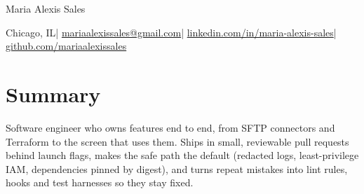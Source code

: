 \documentclass[10pt,letterpaper]{article}
\begin{document}
\begin{center}
  {\fontsize{22}{26}\selectfont Maria Alexis Sales}\par\vspace{4pt}
  \textcolor{muted}{Chicago, IL}\enspace|\enspace
  \href{mailto:mariaalexissales@gmail.com}{mariaalexissales@gmail.com}\enspace|\enspace
  \href{https://www.linkedin.com/in/maria-alexis-sales/}{linkedin.com/in/maria-alexis-sales}\enspace|\enspace
  \href{https://github.com/mariaalexissales}{github.com/mariaalexissales}
\end{center}

\section{Summary}
Software engineer who owns features end to end, from SFTP connectors and Terraform to the screen that uses
them. Ships in small, reviewable pull requests behind launch flags, makes the safe path the default
(redacted logs, least-privilege IAM, dependencies pinned by digest), and turns repeat mistakes into lint
rules, hooks and test harnesses so they stay fixed.
\end{document}
